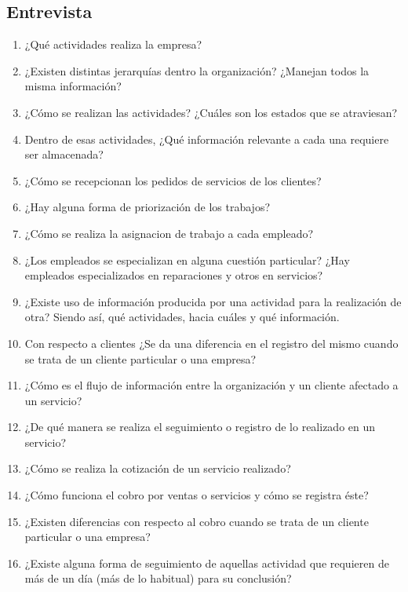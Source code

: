 \documentclass[12pt]{extarticle}
\begin{document}
        \begin{spacing}{1.2}



        \section{Entrevista}
        \begin{enumerate}
            \item ¿Qué actividades realiza la empresa?
            \item ¿Existen distintas jerarquías dentro la organización? ¿Manejan todos la misma información?
            \item ¿Cómo se realizan las actividades? ¿Cuáles son los estados que se atraviesan?
            \item Dentro de esas actividades, ¿Qué información relevante a cada una requiere ser almacenada?
            \item ¿Cómo se recepcionan los pedidos de servicios de los clientes?
            \item ¿Hay alguna forma de priorización de los trabajos?
            \item ¿Cómo se realiza la asignacion de trabajo a cada empleado? 
            \item ¿Los empleados se especializan en alguna cuestión particular? ¿Hay empleados especializados en reparaciones y otros en servicios? 
            \item ¿Existe uso de información producida por una actividad para la realización de otra? Siendo así, qué actividades, hacia cuáles y qué información.
            \item Con respecto a clientes ¿Se da una diferencia en el registro del mismo cuando se trata de un cliente particular o una empresa?
            \item ¿Cómo es el flujo de información entre la organización y un cliente afectado a un servicio?
            \item ¿De qué manera se realiza el seguimiento o registro de lo realizado en un servicio?
            \item ¿Cómo se realiza la cotización de un servicio realizado?
            \item ¿Cómo funciona el cobro por ventas o servicios y cómo se registra éste?
            \item ¿Existen diferencias con respecto al cobro cuando se trata de un cliente particular o una empresa?
            \item ¿Existe alguna forma de seguimiento de aquellas actividad que requieren de más de un día (más de lo habitual) para su conclusión?

\end{enumerate}
\end{spacing}
\end{document}
